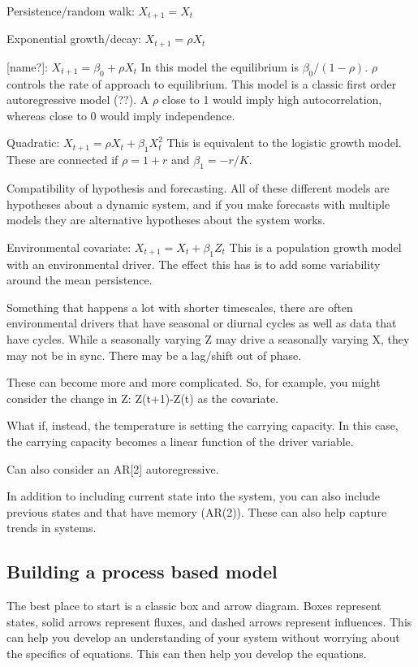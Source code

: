 \documentclass[12pt, oneside]{article}   	%
\begin{document}
Persistence/random walk: $ X_{t+1} = X_{t} $

Exponential growth/decay: $ X_{t+1} = \rho X_{t} $

[name?]: $ X_{t+1} = \beta_0 + \rho X_{t} $ In this model the equilibrium is $\beta_0/(1-\rho)$. $\rho$ controls the rate of approach to equilibrium. This model is a classic first order autoregressive model (??). A $\rho$ close to 1 would imply high autocorrelation, whereas close to 0 would imply independence.

Quadratic: $ X_{t+1} = \rho X_{t} + \beta_1 X_{t}^2 $ This is equivalent to the logistic growth model. These are connected if $\rho = 1+r $ and $\beta_1 = -r/K $.

Compatibility of hypothesis and forecasting. All of these different models are hypotheses about a dynamic system, and if you make forecasts with multiple models they are alternative hypotheses about the system works.

Environmental covariate: $ X_{t+1} = X_{t} + \beta_1 Z_t $ This is a population growth model with an environmental driver. The effect this has is to add some variability around the mean persistence.

Something that happens a lot with shorter timescales, there are often environmental drivers that have seasonal or diurnal cycles as well as data that have cycles. While a seasonally varying Z may drive a seasonally varying X, they may not be in sync. There may be a lag/shift out of phase.

These can become more and more complicated. So, for example, you might consider the change in Z: Z(t+1)-Z(t) as the covariate. 

What if, instead, the temperature is setting the carrying capacity. In this case, the carrying capacity becomes a linear function of the driver variable. 

Can also consider an AR[2] autoregressive. 

In addition to including current state into the system, you can also include previous states and that have memory (AR(2)). These can also help capture trends in systems. 

\subsection{Building a process based model}

The best place to start is a classic box and arrow diagram. Boxes represent states, solid arrows represent fluxes, and dashed arrows represent influences. This can help you develop an understanding of your system without worrying about the specifics of equations. This can then help you develop the equations.
\end{document}
